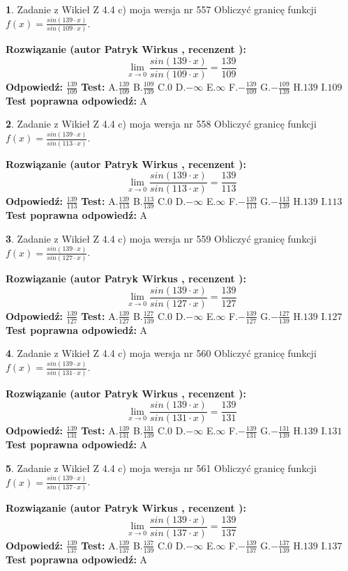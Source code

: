 \documentclass[12pt, a4paper]{article}
\theoremstyle{definition} %
\newtheorem{zad}{}
\newcommand{\zadStart}[1]{\begin{zad}#1\newline}
\newcommand{\zadStop}{\end{zad}}
\newcommand{\rozwStart}[2]{\noindent \textbf{Rozwiązanie (autor #1 , recenzent #2): }\newline}
\newcommand{\rozwStop}{\newline}
\newcommand{\odpStart}{\noindent \textbf{Odpowiedź:}\newline}
\newcommand{\odpStop}{\newline}
\newcommand{\testStart}{\noindent \textbf{Test:}\newline}
\newcommand{\testStop}{\newline}
\newcommand{\kluczStart}{\noindent \textbf{Test poprawna odpowiedź:}\newline}
\newcommand{\kluczStop}{\newline}
\begin{document}
\zadStart{Zadanie z Wikieł Z 4.4 c) moja wersja nr 557}
Obliczyć granicę funkcji $f(x)=\frac{sin(139\cdot x)}{sin(109\cdot x)}$.
\zadStop
\rozwStart{Patryk Wirkus}{}
$$\lim\limits_{x\to 0}\frac{sin(139\cdot x)}{sin(109\cdot x)}=
\frac{139}{109}$$
\rozwStop
\odpStart
$\frac{139}{109}$
\odpStop
\testStart
A.$\frac{139}{109}$
B.$\frac{109}{139}$
C.$0$
D.$-\infty$
E.$\infty$
F.$-\frac{139}{109}$
G.$-\frac{109}{139}$
H.$139$
I.$109$
\testStop
\kluczStart
A
\kluczStop



\zadStart{Zadanie z Wikieł Z 4.4 c) moja wersja nr 558}
Obliczyć granicę funkcji $f(x)=\frac{sin(139\cdot x)}{sin(113\cdot x)}$.
\zadStop
\rozwStart{Patryk Wirkus}{}
$$\lim\limits_{x\to 0}\frac{sin(139\cdot x)}{sin(113\cdot x)}=
\frac{139}{113}$$
\rozwStop
\odpStart
$\frac{139}{113}$
\odpStop
\testStart
A.$\frac{139}{113}$
B.$\frac{113}{139}$
C.$0$
D.$-\infty$
E.$\infty$
F.$-\frac{139}{113}$
G.$-\frac{113}{139}$
H.$139$
I.$113$
\testStop
\kluczStart
A
\kluczStop



\zadStart{Zadanie z Wikieł Z 4.4 c) moja wersja nr 559}
Obliczyć granicę funkcji $f(x)=\frac{sin(139\cdot x)}{sin(127\cdot x)}$.
\zadStop
\rozwStart{Patryk Wirkus}{}
$$\lim\limits_{x\to 0}\frac{sin(139\cdot x)}{sin(127\cdot x)}=
\frac{139}{127}$$
\rozwStop
\odpStart
$\frac{139}{127}$
\odpStop
\testStart
A.$\frac{139}{127}$
B.$\frac{127}{139}$
C.$0$
D.$-\infty$
E.$\infty$
F.$-\frac{139}{127}$
G.$-\frac{127}{139}$
H.$139$
I.$127$
\testStop
\kluczStart
A
\kluczStop



\zadStart{Zadanie z Wikieł Z 4.4 c) moja wersja nr 560}
Obliczyć granicę funkcji $f(x)=\frac{sin(139\cdot x)}{sin(131\cdot x)}$.
\zadStop
\rozwStart{Patryk Wirkus}{}
$$\lim\limits_{x\to 0}\frac{sin(139\cdot x)}{sin(131\cdot x)}=
\frac{139}{131}$$
\rozwStop
\odpStart
$\frac{139}{131}$
\odpStop
\testStart
A.$\frac{139}{131}$
B.$\frac{131}{139}$
C.$0$
D.$-\infty$
E.$\infty$
F.$-\frac{139}{131}$
G.$-\frac{131}{139}$
H.$139$
I.$131$
\testStop
\kluczStart
A
\kluczStop



\zadStart{Zadanie z Wikieł Z 4.4 c) moja wersja nr 561}
Obliczyć granicę funkcji $f(x)=\frac{sin(139\cdot x)}{sin(137\cdot x)}$.
\zadStop
\rozwStart{Patryk Wirkus}{}
$$\lim\limits_{x\to 0}\frac{sin(139\cdot x)}{sin(137\cdot x)}=
\frac{139}{137}$$
\rozwStop
\odpStart
$\frac{139}{137}$
\odpStop
\testStart
A.$\frac{139}{137}$
B.$\frac{137}{139}$
C.$0$
D.$-\infty$
E.$\infty$
F.$-\frac{139}{137}$
G.$-\frac{137}{139}$
H.$139$
I.$137$
\testStop
\kluczStart
A
\kluczStop
\end{document}
